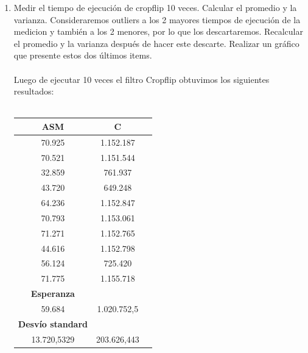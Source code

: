 \begin{enumerate}
    \item Medir el tiempo de ejecución de cropflip 10 veces. Calcular el promedio y la varianza. Consideraremos outliers a los 2 mayores tiempos de ejecución de la medicion y también a los 2 menores, por lo que los descartaremos. Recalcular el promedio y la varianza después de hacer este descarte. Realizar un gráfico que presente estos dos últimos items.\\
\\
Luego de ejecutar 10 veces el filtro Cropflip obtuvimos los siguientes resultados: \\
\\
    	\begin{tabular}[c]{|c|c|c|}
	\hline
		\textbf{ASM} & \textbf{C}\\
		\hline
70.925 &	1.152.187\\
		\hline
70.521 &	1.151.544\\
		\hline
32.859 &	761.937\\
		\hline
43.720 &	649.248\\
		\hline
64.236 &	1.152.847\\
		\hline
70.793 &	1.153.061\\
		\hline
71.271 &	1.152.765\\
		\hline
44.616 &	1.152.798\\
		\hline
56.124 &	725.420\\
		\hline
71.775 &	1.155.718\\
		\hline
	\textbf{Esperanza}	\\
		\hline
59.684 & 1.020.752,5	\\
		\hline
		\textbf{Desvío standard}	\\
		\hline
13.720,5329 & 203.626,443	\\
		\hline
	\end{tabular}\\\\
	

\end{enumerate}
